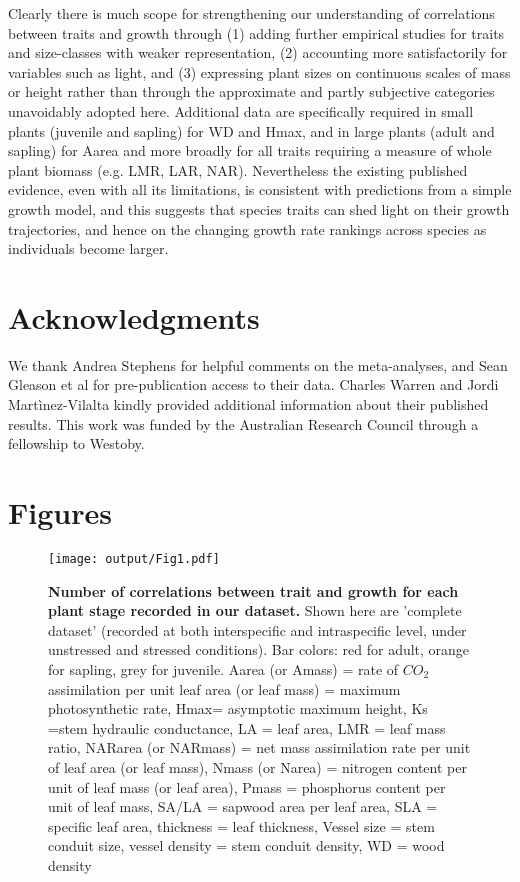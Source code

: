 \documentclass[a4paper]{article}\usepackage[]{graphicx}\usepackage[]{color}
\begin{document}
Clearly there is much scope for strengthening our understanding of correlations between traits and growth through (1) adding further empirical studies for traits and size-classes with weaker representation, (2) accounting more satisfactorily for variables such as light, and (3) expressing plant sizes on continuous scales of mass or height rather than through the approximate and partly subjective categories unavoidably adopted here. Additional data are specifically required in small plants (juvenile and sapling) for WD and Hmax, and in large plants (adult and sapling) for Aarea and more broadly for all traits requiring a measure of whole plant biomass (e.g. LMR, LAR, NAR). Nevertheless the existing published evidence, even with all its limitations, is consistent with predictions from a simple growth model, and this suggests that species traits can shed light on their growth trajectories, and hence on the changing growth rate rankings across species as individuals become larger. 



\section*{Acknowledgments}\label{Acknowledgment}

We thank Andrea Stephens for helpful comments on the meta-analyses, and Sean Gleason et al for pre-publication access to their data. Charles Warren and Jordi Martìnez-Vilalta kindly provided additional information about their published results. This work was funded by the Australian Research Council through a fellowship to Westoby.  

\clearpage
\linespread{1}

\label{references}

\newpage
\section*{Figures}

\begin{figure}[htbp]
\centering
\texttt{[image: output/Fig1.pdf]}
\caption{\textbf{Number of correlations between trait and growth for each plant stage recorded in our dataset.} Shown here are 'complete dataset' (recorded at both interspecific and intraspecific level, under unstressed and stressed conditions). Bar colors: red for adult, orange for sapling, grey for juvenile. Aarea (or Amass) = rate of $CO_{2}$ assimilation per unit leaf area (or leaf mass) = maximum photosynthetic rate, Hmax= asymptotic maximum height,  Ks =stem hydraulic conductance, LA = leaf area, LMR = leaf mass ratio, NARarea (or NARmass) = net mass assimilation rate per unit of leaf area (or leaf mass), Nmass (or Narea) = nitrogen content per unit of leaf mass (or leaf area), Pmass = phosphorus content per unit of leaf mass, SA/LA = sapwood area per leaf area, SLA = specific leaf area, thickness = leaf thickness, Vessel size = stem conduit size, vessel density = stem conduit density, WD = wood density}
\label{Fig1}
\end{figure}
\end{document}
